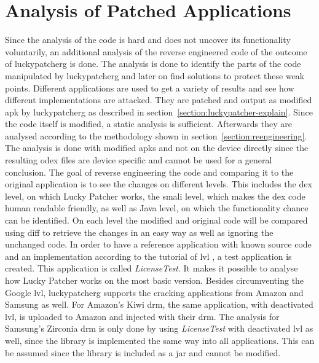 \section{Analysis of Patched Applications} \label{section:luckypatcher-operation}
Since the analysis of the code is hard and does not uncover its functionality  voluntarily, an additional analysis of the reverse engineered code of the outcome of \gls{luckypatcherg} is done.
The analysis is done to identify the parts of the code manipulated by \gls{luckypatcherg} and later on find solutions to protect these weak points.
Different applications are used to get a variety of results and see how different implementations are attacked.
They are patched and output as modified \gls{apk} by \gls{luckypatcherg} as described in section~\ref{section:luckypatcher-explain}.
Since the code itself is modified, a static analysis is sufficient.
Afterwards they are analysed according to the methodology shown in  section~\ref{section:reengineering}.
The analysis is done with modified \gls{apk}s and not on the device directly since the resulting \gls{odex} files are device specific and cannot be used for a general conclusion.
\newline
The goal of reverse engineering the code and comparing it to the original application is to see the changes on different levels.
This includes the \gls{dex} level, on which Lucky Patcher works, the smali level, which makes the \gls{dex} code human readable friendly, as well as Java level, on which the functionality chance can be identified.
On each level the modified and original code will be compared using diff to retrieve the changes in an easy way as well as ignoring the unchanged code.
\newline
In order to have a reference application with known source code and an implementation according to the tutorial of \gls{lvl} \cite{developersLicensingAdding}, a test application is created.
This application is called \textit{LicenseTest}.
It makes it possible to analyse how Lucky Patcher works on the most basic version.
Besides circumventing the Google \gls{lvl}, \gls{luckypatcherg} supports the cracking applications from Amazon and Samsung as well.
For Amazon's Kiwi \gls{drm}, the same application, with deactivated \gls{lvl}, is uploaded to Amazon and injected with their \gls{drm}.
The analysis for Samsung’s Zirconia \gls{drm} is only done by using \textit{LicenseTest} with deactivated \gls{lvl} as well, since the library is implemented the same way into all applications.
This can be assumed since the library is included as a \gls{jar} and cannot be modified.
